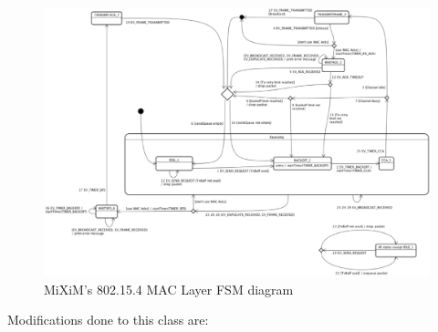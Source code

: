 \begin{figure}[ht]
 \begin{center}
  \includegraphics[width=1\textwidth]{csmaFSM.eps}
 \end{center}
 \caption{\ac{MiXiM}'s 802.15.4 \ac{MAC} Layer \ac{FSM} diagram \cite{MiXiM}}
 \label{fig:csmaFSM}
\end{figure}

Modifications done to this class are:

